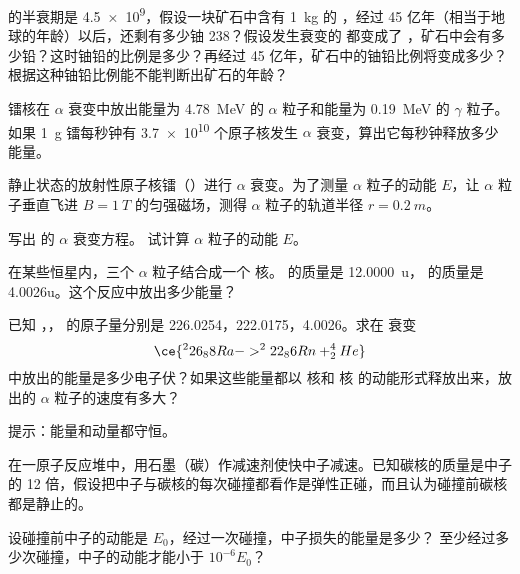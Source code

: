 \begin{Exercise}
\begin{question}
  \item {} 的半衰期是 \qty{4.5e9}{}，假设一块矿石中含有 \qty{1}{kg} 的  ，经过 45 亿年（相当于地球的年龄）以后，还剩有多少铀 238？假设发生衰变的   都变成了  ，矿石中会有多少铅？这时铀铅的比例是多少？再经过 45 亿年，矿石中的铀铅比例将变成多少？ 根据这种铀铅比例能不能判断出矿石的年龄？
  \item 镭核在 $\alpha$ 衰变中放出能量为 \qty{4.78}{MeV} 的 $\alpha$ 粒子和能量为 \qty{0.19}{MeV} 的 $\gamma$ 粒子。如果 \qty{1}{g} 镭每秒钟有 \num{3.7e10} 个原子核发生 $\alpha$ 衰变，算出它每秒钟释放多少能量。
  \item 静止状态的放射性原子核镭（）进行 $\alpha$ 衰变。为了测量 $\alpha$ 粒子的动能 $E$，让 $\alpha$ 粒子垂直飞进 $B=\qty{1}{T} $ 的匀强磁场，测得 $\alpha$ 粒子的轨道半径 $r=\qty{0.2}{m}$。
  \begin{tasks}
    \task 写出 的 $\alpha$ 衰变方程。
    \task 试计算 $\alpha$ 粒子的动能 $E$。
  \end{tasks}
  \item 在某些恒星内，三个 $\alpha$ 粒子结合成一个  核。 的质量是 \qty{12.0000}{u}， 的质量是 4.0026u。这个反应中放出多少能量？
  \item 已知 ，， 的原子量分别是 226.0254，222.0175，4.0026。求在  衰变
  \[ \ce{ ^226_88Ra -> ^222_86Rn + ^4_2He}\]
  中放出的能量是多少电子伏？如果这些能量都以  核和 核 的动能形式释放出来，放出的 $\alpha$ 粒子的速度有多大？

  提示：能量和动量都守恒。
  \item 在一原子反应堆中，用石墨（碳）作减速剂使快中子减速。已知碳核的质量是中子的 12 倍，假设把中子与碳核的每次碰撞都看作是弹性正碰，而且认为碰撞前碳核都是静止的。
  \begin{tasks}
    \task 设碰撞前中子的动能是 $E_0$，经过一次碰撞，中子损失的能量是多少？
    \task 至少经过多少次碰撞，中子的动能才能小于 $10^{-6}E_0$？
  \end{tasks}
\end{question}
\end{Exercise}
